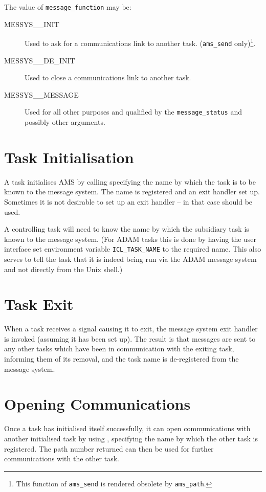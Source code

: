 \documentclass[twoside,11pt,nolof]{starlink}
\begin{document}
The value of \texttt{message\_function} may be:
\begin{description}
\item[MESSYS\_\_INIT] Used to ask for a communications link to another task.
(\texttt{ams\_send} only)\footnote{This function of \texttt{ams\_send} is
rendered obsolete by \texttt{ams\_path}.}.
\item[MESSYS\_\_DE\_INIT] Used to close a communications link to another task.
\item[MESSYS\_\_MESSAGE] Used for all other purposes and qualified by the
\texttt{message\_status} and possibly other arguments.
\end{description}

\section{Task Initialisation}
A task initialises AMS by calling
specifying the name by which the task is to be known to the
message system. The name is registered and an exit handler set up.
Sometimes it is not desirable to set up an exit handler -- in that case
should be used.

A controlling task will need to know the name by which the subsidiary task is
known to the message system.
(For ADAM tasks this is done by having the user interface set
environment variable \texttt{ICL\_TASK\_NAME} to the required name.
This also serves to tell the task that it is indeed being run via the ADAM
message system and not directly from the Unix shell.)

\section{Task Exit}
When a task receives a signal causing it to exit, the message system exit
handler is invoked (assuming it has been set up).
The result is that messages are sent to any other tasks which have been in
communication with the exiting task, informing them of its removal, and the
task name is de-registered from the message system.

\section{Opening Communications}
Once a task has initialised itself successfully, it can open communications
with another initialised task by using
,
specifying the name by which the other task is registered.
The path number returned can then be used for further communications with the
other task.
\end{document}
